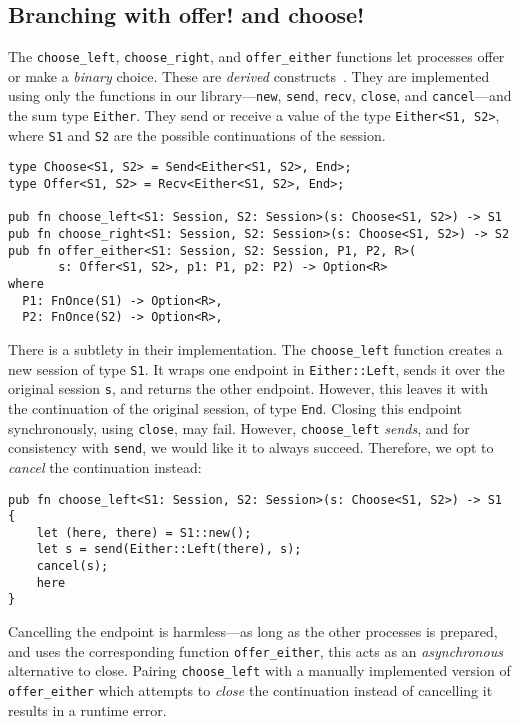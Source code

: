 \documentclass[copyright,creativecommons]{eptcs}
\begin{document}
\subsection{Branching with offer! and choose!}\label{sec:choice}
The \lstinline{choose_left}, \lstinline{choose_right}, and \lstinline{offer_either} functions let processes offer or make a \emph{binary} choice. These are \emph{derived} constructs~\cite{honda1993,dardha2017}. They are implemented using only the functions in our library---\lstinline{new}, \lstinline{send}, \lstinline{recv}, \lstinline{close}, and \lstinline{cancel}---and the sum type \lstinline{Either}. They send or receive a value of the type \lstinline{Either<S1, S2>}, where \lstinline{S1} and \lstinline{S2} are the possible continuations of the session.
\begin{lstlisting}
type Choose<S1, S2> = Send<Either<S1, S2>, End>;
type Offer<S1, S2> = Recv<Either<S1, S2>, End>;

pub fn choose_left<S1: Session, S2: Session>(s: Choose<S1, S2>) -> S1
pub fn choose_right<S1: Session, S2: Session>(s: Choose<S1, S2>) -> S2
pub fn offer_either<S1: Session, S2: Session, P1, P2, R>(
       s: Offer<S1, S2>, p1: P1, p2: P2) -> Option<R>
where
  P1: FnOnce(S1) -> Option<R>,
  P2: FnOnce(S2) -> Option<R>,
\end{lstlisting}
There is a subtlety in their implementation. The \lstinline{choose_left} function creates a new session of type \lstinline{S1}. It wraps one endpoint in \lstinline{Either::Left}, sends it over the original session \lstinline{s}, and returns the other endpoint. However, this leaves it with the continuation of the original session, of type \lstinline{End}. Closing this endpoint synchronously, using \lstinline{close}, may fail. However, \lstinline{choose_left} \emph{sends}, and for consistency with \lstinline{send}, we would like it to always succeed. Therefore, we opt to \emph{cancel} the continuation instead:
\begin{lstlisting}
pub fn choose_left<S1: Session, S2: Session>(s: Choose<S1, S2>) -> S1 {
    let (here, there) = S1::new();
    let s = send(Either::Left(there), s);
    cancel(s);
    here
} 
\end{lstlisting}
Cancelling the endpoint is harmless---as long as the other processes is prepared, and uses the corresponding function \lstinline{offer_either}, this acts as an \emph{asynchronous} alternative to close. Pairing \lstinline{choose_left} with a manually implemented version of \lstinline{offer_either} which attempts to \emph{close} the continuation instead of cancelling it results in a runtime error.
\end{document}
